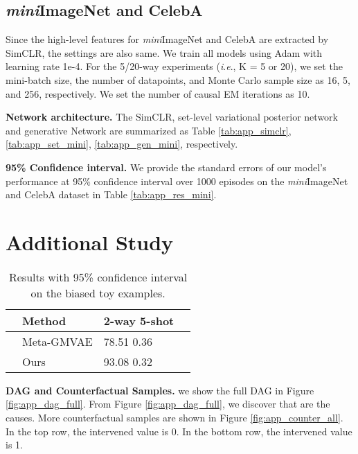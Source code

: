 \documentclass[letterpaper]{article} \usepackage{aaai23}  \usepackage{times}  \usepackage{helvet}  \usepackage{courier}  \usepackage[hyphens]{url}  \usepackage{graphicx} \urlstyle{rm} \def\UrlFont{\rm}  \usepackage{natbib}  \usepackage{caption} \frenchspacing  \setlength{\pdfpagewidth}{8.5in}  \setlength{\pdfpageheight}{11in}  \usepackage{algorithm}
\newcommand{\ie}{\textit{i}.\textit{e}.}
\theoremstyle{plain}
\theoremstyle{definition}
\theoremstyle{remark}
\begin{document}
\subsection{\textit{mini}ImageNet and CelebA}
Since the high-level features for \textit{mini}ImageNet and CelebA are extracted by SimCLR, the settings are also same.  We train all models using Adam \cite{kingma2015adam} with learning rate 1e-4. For the 5/20-way  experiments (\ie, K = 5 or 20), we set the mini-batch size, the number of datapoints, and Monte Carlo sample size as 16, 5, and 256, respectively. We set the number of causal EM iterations as 10.

\textbf{Network architecture.} The SimCLR, set-level variational posterior network  and generative Network  are summarized as Table \ref{tab:app_simclr}, \ref{tab:app_set_mini}, \ref{tab:app_gen_mini}, respectively.

\textbf{95\% Confidence interval.} We provide the standard errors of our model’s performance at 95\% confidence interval over 1000 episodes on the \textit{mini}ImageNet and CelebA dataset in Table \ref{tab:app_res_mini}.






\section{Additional Study}





\begin{table}[]
	\centering
	\caption{Results with 95\% confidence interval on the biased toy examples.}  
	\label{tab:app_res_others}
	\begin{tabular}{llll}\toprule
		& Method     & 2-way 5-shot     &  \\ \midrule
		& Meta-GMVAE & 78.51  0.36 &  \\ 
		& Ours       & 93.08  0.32 &  \\ \bottomrule
	\end{tabular}
\end{table}


\textbf{DAG and Counterfactual Samples.} \label{app:counter}
we show the full DAG in  Figure \ref{fig:app_dag_full}. From Figure \ref{fig:app_dag_full},  we  discover that  are the causes.
More counterfactual samples are shown in Figure \ref{fig:app_counter_all}.  In the top row, the intervened value is 0. In the bottom row, the intervened value is 1. 
\end{document}
